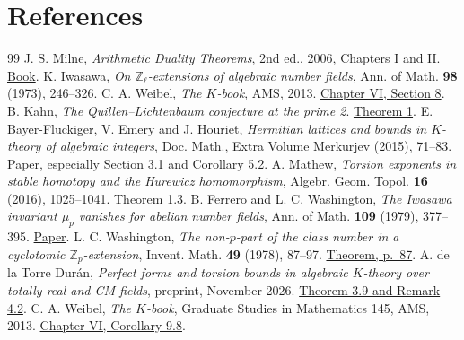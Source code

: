 \documentclass[a4paper,11pt]{article}
\theoremstyle{definition}
\theoremstyle{remark}
\newcommand{\ZZ}{\mathbb Z}\newcommand{\ord}{\operatorname{ord}}
\numberwithin{equation}{section}
\begin{document}
\clearpage
\section{References}\label{nav:bibliography-IV}
\begingroup{}\begin{thebibliography}{99}\small
{} J. S. Milne, \emph{Arithmetic Duality Theorems}, 2nd ed., 2006, Chapters I and II. \href{https://www.jmilne.org/math/Books/ADTnot.pdf}{Book}.
 K. Iwasawa, \emph{On \(\ZZ_\ell\)-extensions of algebraic number fields}, Ann. of Math. \textbf{98} (1973), 246--326.
 C. A. Weibel, \emph{The \(K\)-book}, AMS, 2013. \href{https://sites.math.rutgers.edu/~weibel/Kbook/Kbook.VI.pdf}{Chapter VI, Section 8}.
 B. Kahn, \emph{The Quillen--Lichtenbaum conjecture at the prime 2}. \href{https://webusers.imj-prg.fr/~bruno.kahn/preprints/QL2.pdf}{Theorem 1}.
 E. Bayer-Fluckiger, V. Emery and J. Houriet, \emph{Hermitian lattices and bounds in \(K\)-theory of algebraic integers}, Doc. Math., Extra Volume Merkurjev (2015), 71--83. \href{https://arxiv.org/abs/1406.5953}{Paper}, especially Section 3.1 and Corollary 5.2.
 A. Mathew, \emph{Torsion exponents in stable homotopy and the Hurewicz homomorphism}, Algebr. Geom. Topol. \textbf{16} (2016), 1025--1041. \href{https://msp.org/agt/2016/16-2/agt-v16-n2-p12-s.pdf}{Theorem 1.3}.
 B. Ferrero and L. C. Washington, \emph{The Iwasawa invariant \(\mu_p\) vanishes for abelian number fields}, Ann. of Math. \textbf{109} (1979), 377--395. \href{https://doi.org/10.2307/1971116}{Paper}.
 L. C. Washington, \emph{The non-\(p\)-part of the class number in a cyclotomic \(\ZZ_p\)-extension}, Invent. Math. \textbf{49} (1978), 87--97. \href{https://www.researchgate.net/profile/Lawrence-Washington/publication/226757118_The_non-p-part_of_the_class_number_in_a_cyclotomic_Zp-extension/links/0deec51929879ecc4a000000/The-non-p-part-of-the-class-number-in-a-cyclotomic-Zp-extension.pdf}{Theorem, p.~87}.
 A. de la Torre Dur\'an, \emph{Perfect forms and torsion bounds in algebraic \(K\)-theory over totally real and CM fields}, preprint, November 2026. \href{https://arxiv.org/abs/2611.06300}{Theorem 3.9 and Remark 4.2}.
 C. A. Weibel, \emph{The \(K\)-book}, Graduate Studies in Mathematics 145, AMS, 2013. \href{https://sites.math.rutgers.edu/~weibel/Kbook/Kbook.VI.pdf}{Chapter VI, Corollary 9.8}.

\end{thebibliography}
\end{document}
